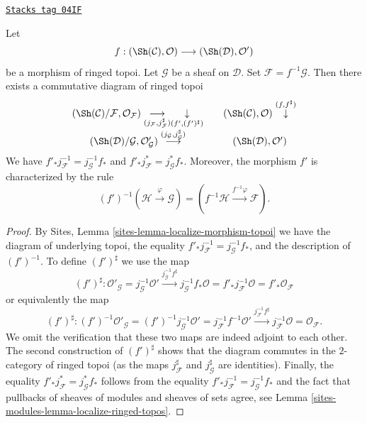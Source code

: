 \begin{lemma}
\label{sites-modules-lemma-localize-morphism-ringed-topoi}
\href{https://stacks.math.columbia.edu/tag/04IF}{\texttt{Stacks tag 04IF}}

Let
$$
f :
(\Sh(\mathcal{C}), \mathcal{O})
\longrightarrow
(\Sh(\mathcal{D}), \mathcal{O}')
$$
be a morphism of ringed topoi. Let $\mathcal{G}$ be a sheaf on $\mathcal{D}$.
Set $\mathcal{F} = f^{-1}\mathcal{G}$.
Then there exists a commutative diagram of ringed topoi
$$
\begin{array}{ccc}(\Sh(\mathcal{C})/\mathcal{F}, \mathcal{O}_\mathcal{F})
\underset{(j_\mathcal{F}, j_\mathcal{F}^\sharp)}{\longrightarrow}\underset{(f', (f')^\sharp)}{\downarrow} &  & (\Sh(\mathcal{C}), \mathcal{O}) \overset{(f, f^\sharp)}{\downarrow} \\ (\Sh(\mathcal{D})/\mathcal{G}, \mathcal{O}'_\mathcal{G})
\overset{(j_\mathcal{G}, j_\mathcal{G}^\sharp)}{\longrightarrow} &  & (\Sh(\mathcal{D}), \mathcal{O}')\end{array}
$$
We have $f'_*j_\mathcal{F}^{-1} = j_\mathcal{G}^{-1}f_*$
and $f'_*j_\mathcal{F}^* = j_\mathcal{G}^*f_*$. Moreover, the
morphism $f'$ is characterized by the rule
$$
(f')^{-1}(\mathcal{H} \xrightarrow{\varphi} \mathcal{G})
=
(f^{-1}\mathcal{H} \xrightarrow{f^{-1}\varphi} \mathcal{F}).
$$
\end{lemma}

\begin{proof}
By
Sites, Lemma \ref{sites-lemma-localize-morphism-topoi}
we have the diagram of underlying topoi, the
equality $f'_*j_\mathcal{F}^{-1} = j_\mathcal{G}^{-1}f_*$, and
the description of $(f')^{-1}$.
To define $(f')^\sharp$ we use the map
$$
(f')^\sharp :
\mathcal{O}'_\mathcal{G} =
j_\mathcal{G}^{-1} \mathcal{O}'
\xrightarrow{j_\mathcal{G}^{-1}f^\sharp}
j_\mathcal{G}^{-1} f_*\mathcal{O} =
f'_* j_\mathcal{F}^{-1}\mathcal{O} =
f'_* \mathcal{O}_\mathcal{F}
$$
or equivalently the map
$$
(f')^\sharp :
(f')^{-1}\mathcal{O}'_\mathcal{G} =
(f')^{-1}j_\mathcal{G}^{-1} \mathcal{O}' =
j_\mathcal{F}^{-1}f^{-1}\mathcal{O}'
\xrightarrow{j_\mathcal{F}^{-1}f^\sharp}
j_\mathcal{F}^{-1} \mathcal{O} =
\mathcal{O}_\mathcal{F}.
$$
We omit the verification that these two maps are indeed adjoint
to each other. The second construction of $(f')^\sharp$ shows that
the diagram commutes in the $2$-category of ringed topoi (as the
maps $j_\mathcal{F}^\sharp$ and $j_\mathcal{G}^\sharp$ are identities).
Finally, the equality $f'_*j_\mathcal{F}^* = j_\mathcal{G}^*f_*$
follows from the equality
$f'_*j_\mathcal{F}^{-1} = j_\mathcal{G}^{-1}f_*$
and the fact that pullbacks of sheaves of modules and sheaves of sets agree,
see
Lemma \ref{sites-modules-lemma-localize-ringed-topos}.
\end{proof}

